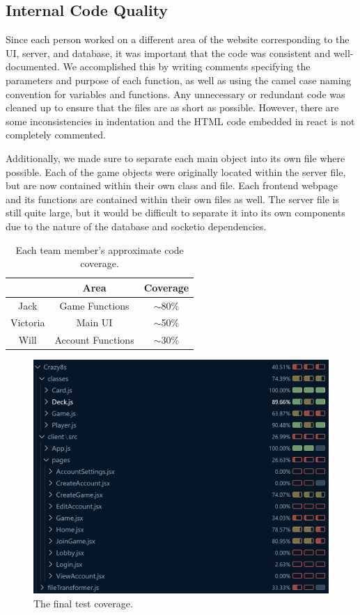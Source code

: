 \subsection{Internal Code Quality}

Since each person worked on a different area of the website corresponding to the UI, server, and database, it was important that the code was consistent and well-documented. We accomplished this by writing comments specifying the parameters and purpose of each function, as well as using the camel case naming convention for variables and functions. Any unnecessary or redundant code was cleaned up to ensure that the files are as short as possible. However, there are some inconsistencies in indentation and the HTML code embedded in react is not completely commented.

Additionally, we made sure to separate each main object into its own file where possible. Each of the game objects were originally located within the server file, but are now contained within their own class and file. Each frontend webpage and its functions are contained within their own files as well. The server file is still quite large, but it would be difficult to separate it into its own components due to the nature of the database and socketio dependencies.


\begin{table}[h]

\centering
\begin{tabular}{|c|c|c|}
\hline
\textbf{} & \textbf{Area}     & \textbf{Coverage} \\ \hline
Jack      & Game Functions    & $\sim$80\%        \\ \hline
Victoria  & Main UI           & $\sim$50\%        \\ \hline
Will      & Account Functions & $\sim$30\%        \\ \hline

\end{tabular}
\caption{\label{fig:coverage} Each team member's approximate code coverage.}
\end{table}

\begin{figure}[H]
\centering
\includegraphics[width=\linewidth]{sprint3tests.png}
\caption{\label{fig:sprint3tests}The final test coverage.}
\end{figure}

